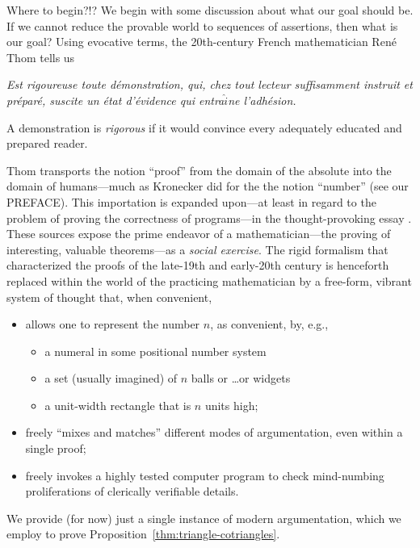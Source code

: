 Where to begin?!?  We begin with some discussion about what our goal
should be.  If we cannot reduce the provable world to sequences of
assertions, then what is our goal?  Using evocative terms, the
20th-century French mathematician Ren\'{e} Thom 
tells us

\bigskip

\begin{minipage}{0.95\textwidth}
{\em Est rigoureuse toute d\'{e}monstration, qui, chez tout lecteur
  suffisamment instruit et pr\'{e}par\'{e}, suscite un \'{e}tat
  d'\'{e}vidence qui entra$\hat{i}$ne l'adh\'{e}sion.}

\smallskip

A demonstration is {\em rigorous} if it would convince every
adequately educated and prepared reader.
\end{minipage}

\bigskip

\noindent
Thom transports the notion ``proof'' from the domain of the absolute
into the domain of humans---much as Kronecker did for the the notion
``number'' (see our PREFACE).  This importation is expanded upon---at
least in regard to the problem of proving the correctness of
programs---in the thought-provoking essay \cite{DeMilloLP79}.  These
sources expose the prime endeavor of a mathematician---the proving of
interesting, valuable theorems---as a {\em social exercise}.  The
rigid formalism that characterized the proofs of the late-19th and
early-20th century is henceforth replaced within the world of the
practicing mathematician by a free-form, vibrant system of thought
that, when convenient,
\begin{itemize}
\item
allows one to represent the number $n$, as convenient, by, e.g.,
  \begin{itemize}
  \item
a numeral in some positional number system
  \item
a set (usually imagined) of $n$ balls or \ldots or widgets
  \item
a unit-width rectangle that is $n$ units high;
  \end{itemize}

\item
freely ``mixes and matches'' different modes of argumentation, even
within a single proof;

\item
freely invokes a highly tested computer program to check mind-numbing
proliferations of clerically verifiable details.
\end{itemize}
We provide (for now) just a single instance of modern argumentation,
which we employ to prove Proposition~\ref{thm:triangle-cotriangles}.

